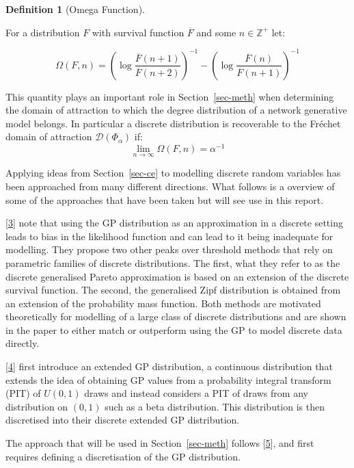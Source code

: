 \documentclass[
  10pt,
  a4paper,
]{scrreprt}
\theoremstyle{plain}
\theoremstyle{plain}
\theoremstyle{definition}
\newtheorem{definition}{Definition}[section]
\theoremstyle{plain}
\theoremstyle{remark}
\begin{document}
{\begin{definition}[Omega
Function]\protect\hypertarget{def-omega}{}\label{def-omega}

For a distribution \(F\) with survival function \(\overline F\) and some
\(n\in\mathbb Z^+\) let:

\[
\Omega(F,n) = \left(\log\displaystyle\frac{\overline F (n+1)}{\overline F (n+2)}\right)^{-1} - \left(\log\displaystyle\frac{\overline F (n)}{\overline F (n+1)}\right)^{-1}
\]

\end{definition}

This quantity plays an important role in Section~\ref{sec-meth} when
determining the domain of attraction to which the degree distribution of
a network generative model belongs. In particular a discrete
distribution is recoverable to the Fréchet domain of attraction
\(\mathcal D(\Phi_\alpha)\) if: \[
\lim_{n\rightarrow\infty}\Omega(F,n) = \alpha^{-1}
\]

Applying ideas from Section~\ref{sec-ce} to modelling discrete random
variables has been approached from many different directions. What
follows is a overview of some of the approaches that have been taken but
will see use in this report.

{[}\protect\hyperlink{ref-hds24}{3}{]} note that using the GP
distribution as an approximation in a discrete setting leads to bias in
the likelihood function and can lead to it being inadequate for
modelling. They propose two other peaks over threshold methods that rely
on parametric families of discrete distributions. The first, what they
refer to as the discrete generalised Pareto approximation is based on an
extension of the discrete survival function. The second, the generalised
Zipf distribution is obtained from an extension of the probability mass
function. Both methods are motivated theoretically for modelling of a
large class of discrete distributions and are shown in the paper to
either match or outperform using the GP to model discrete data directly.

{[}\protect\hyperlink{ref-agn22}{4}{]} first introduce an extended GP
distribution, a continuous distribution that extends the idea of
obtaining GP values from a probability integral transform (PIT) of
\(U(0,1)\) draws and instead considers a PIT of draws from any
distribution on \((0,1)\) such as a beta distribution. This distribution
is then discretised into their discrete extended GP distribution.

The approach that will be used in Section~\ref{sec-meth} follows
{[}\protect\hyperlink{ref-Rohrbeck_2018}{5}{]}, and first requires
defining a discretisation of the GP distribution.

}
\end{document}
